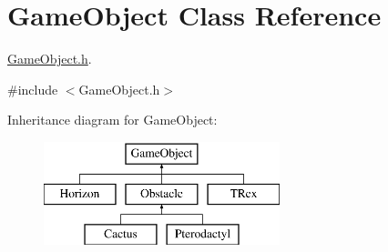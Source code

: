\hypertarget{class_game_object}{}\section{Game\+Object Class Reference}
\label{class_game_object}


\mbox{\hyperlink{_game_object_8h_source}{Game\+Object.\+h}}.  




{\ttfamily \#include $<$Game\+Object.\+h$>$}

Inheritance diagram for Game\+Object\+:\begin{figure}[H]
\begin{center}
\leavevmode
\includegraphics[height=3.000000cm]{class_game_object}
\end{center}
\end{figure}

